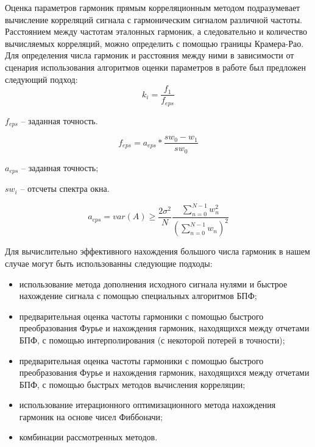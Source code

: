 Оценка параметров гармоник прямым корреляционным методом подразумевает вычисление корреляций сигнала с гармоническим сигналом различной частоты. Расстоянием между частотам эталонных гармоник, а следовательно и количество вычисляемых корреляций, можно определить с помощью границы Крамера-Рао. Для определения числа гармоник и расстояния между ними в зависимости от сценария использования алгоритмов оценки параметров в работе был предложен следующий подход:
\begin{equation}
\label{eq:equation20}
k_i=\frac{f_1}{f_{eps}}
\end{equation} 

${f_{eps}}$ -- заданная точность.

\begin{equation}
\label{eq:equation21}
f_{eps}=a_{eps}*\frac{sw_0-w_1}{sw_0} 
\end{equation} 

$a_{eps}$ -- заданная точность;

$sw_i$ -- отсчеты спектра окна.

\begin{equation}
\label{eq:equation22}
a_{eps} = var(A)\geq \frac{2\sigma^2}{N}  \frac{\sum_{n=0}^{N-1}w_n^2}{\left(\sum_{n=0}^{N-1} w_n \right)^2}
\end{equation} 

Для вычислительно эффективного нахождения большого числа гармоник в нашем случае могут быть использованны следующие подходы:
\begin{itemize}
\item использование метода дополнения исходного сигнала нулями и быстрое нахождение сигнала с помощью специальных алгоритмов БПФ;

\item предварительная оценка частоты гармоники с помощью быстрого преобразования Фурье и нахождения гармоник, находящихся между отчетами БПФ, с помощью интерполирования (с некоторой потерей в точности);

\item предварительная оценка частоты гармоники с помощью быстрого преобразования Фурье и нахождения гармоник, находящихся между отчетами БПФ, с помощью быстрых методов вычисления корреляции;

\item использование итерационного оптимизационного метода нахождения гармоник на основе чисел Фиббоначи;
\item комбинации рассмотренных методов.
\end{itemize}

